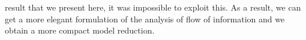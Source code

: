 \documentclass{entcs}
\begin{document}
result that we present here, it was impossible to exploit this. As a result, we can get a more elegant formulation of the analysis of flow of information and  we obtain a more compact model reduction.




\end{document}
